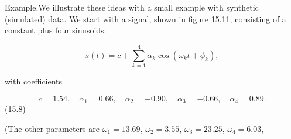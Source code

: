 Example.We illustrate these ideas with a small example with synthetic (simulated) data. We start with a signal, shown in figure 15.11, consisting of a constant plus four sinusoids:

\[s(t)=c+\sum_{k=1}^{4}\alpha_{k}\cos(\omega_{k}t+\phi_{k}),\]

with coefficients

\[c=1.54,\quad\alpha_{1}=0.66,\quad\alpha_{2}=-0.90,\quad\alpha_{3}=-0.66,\quad \alpha_{4}=0.89.\] (15.8)

(The other parameters are \(\omega_{1}=13.69\), \(\omega_{2}=3.55\), \(\omega_{3}=23.25\), \(\omega_{4}=6.03\), 